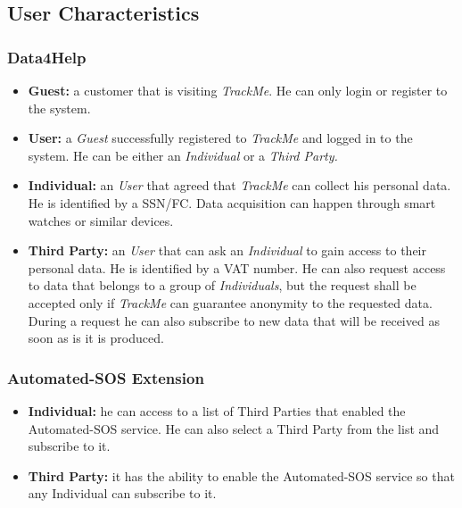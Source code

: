 \documentclass[a4paper]{article}
\begin{document}
    \newpage
    
    \subsection{User Characteristics}
        \subsubsection{Data4Help}
        \begin{itemize}
            \item \textbf{Guest:} a customer that is visiting \textit{TrackMe}. He can only login or register to the system.
            \item \textbf{User:} a \textit{Guest} successfully registered to \textit{TrackMe} and logged in to the system. He can be either an \textit{Individual} or a \textit{Third Party.}
            \item \textbf{Individual:} an \textit{User} that agreed that \textit{TrackMe} can collect his personal data. He is identified by a SSN/FC. Data acquisition can happen through smart watches or similar devices.
            \item \textbf{Third Party:} an \textit{User} that can ask an \textit{Individual} to gain access to their personal data. He is identified by a VAT number. He can also request access to data that belongs to a group of \textit{Individuals}, but the request shall be accepted only if \textit{TrackMe} can guarantee anonymity to the requested data. During a request he can also subscribe to new data that will be received as soon as is it is produced.
        \end{itemize}

        \subsubsection{Automated-SOS Extension}
        \begin{itemize}
            \item \textbf{Individual:} he can access to a list of Third Parties that enabled the Automated-SOS service. He can also select a Third Party from the list and subscribe to it.
            \item \textbf{Third Party:} it has the ability to enable the Automated-SOS service so that any Individual can subscribe to it.
        \end{itemize}
        
\end{document}
